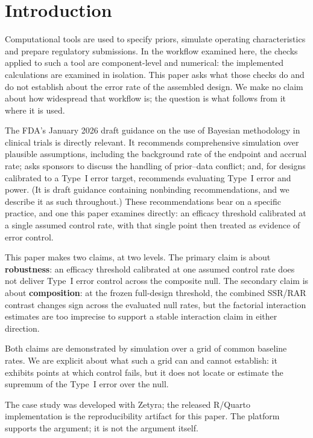 \documentclass[11pt]{article}
\begin{document}
\section{Introduction}

Computational tools are used to specify priors, simulate operating
characteristics and prepare regulatory submissions.  In the workflow examined
here, the checks applied to such a tool are component-level and numerical: the
implemented calculations are examined in isolation.
This paper asks what those checks do and do not establish about the error rate
of the assembled design.  We make no claim about how widespread that workflow
is; the question is what follows from it where it is used.

The FDA's January 2026 draft guidance on the use of Bayesian methodology in
clinical trials \citep{fda_bayesian_2026} is directly relevant.  It recommends
comprehensive simulation over plausible assumptions, including the background
rate of the endpoint and accrual rate; asks sponsors to discuss the handling of
prior--data conflict; and, for designs calibrated to a Type~I error target,
recommends evaluating Type~I error and power.  (It is draft guidance containing
nonbinding recommendations, and we describe it as such throughout.)  These
recommendations bear on a specific practice, and one this paper examines
directly: an efficacy threshold calibrated at a single assumed control rate,
with that single point then treated as evidence of error control.

This paper makes two claims, at two levels.  The primary claim is about
\textbf{robustness}: an efficacy threshold calibrated at one assumed control
rate does not deliver Type~I error control across the composite null.  The
secondary claim is about \textbf{composition}: at the frozen full-design
threshold, the combined SSR/RAR contrast changes sign across the evaluated
null rates, but the factorial interaction estimates are too imprecise to
support a stable interaction claim in either direction.

Both claims are demonstrated by simulation over a grid of common baseline
rates.  We are explicit about what such a grid can and cannot establish: it
exhibits points at which control fails, but it does not locate or estimate the
supremum of the Type~I error over the null.

The case study was developed with Zetyra; the released R/Quarto implementation
is the reproducibility artifact for this paper.  The platform supports the
argument; it is not the argument itself.
\end{document}
